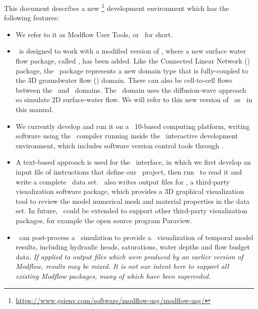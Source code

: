 \label{texfile:Introduction} This document describes a new \mfu\footnote{\url{https://www.gsienv.com/software/modflow-usg/modflow-usg/}}  development environment which has the following features:
\begin{itemize}
    \item We refer to it as Modflow User Tools, or \mut\ for short.
    \item \mut\ is designed to work with a modified version of \mfu,  where a new surface water flow package, called \swf, has been added. Like the Connected Linear Network (\cln) package, the \swf\ package represents a new domain type that is fully-coupled to the 3D groundwater flow (\gwf) domain. There can also be cell-to-cell flows between the \swf\ and \cln\ domains.  The \swf\ domain uses the diffusion-wave approach so simulate 2D surface-water flow. We will refer to this new version of \mfu\ as \mfus\ in this manual.
    \item We currently develop and run it on a \windows\ 10-based computing platform, writing software using the \ifort\ compiler running inside the \vstudio\ interactive development environment, which includes software version control tools through \github.
    \item A text-based approach is used for the \mut\ interface, in which we first develop an input file of instructions that define our \mfus\ project,  then run \mut\ to read it and write a complete \mfus\ data set. \mut\ also writes output files for \tecplot, a third-party visualization software package, which provides a 3D graphical visualization tool to review the model numerical mesh and material properties in the data set. In future, \mut\ could be extended to support other third-party visualization packages, for example the open source program Paraview.
    \item \mut\ can post-process a \mfus\ simulation to provide a \tecplot\ visualization of temporal model results, including hydraulic heads, saturations, water depths and flow budget data.  \textit{If applied to output files which were produced by an earlier version of Modflow, results may be mixed.  It is not our intent here to support all existing Modflow packages, many of which have been superceded.}
\end{itemize}

